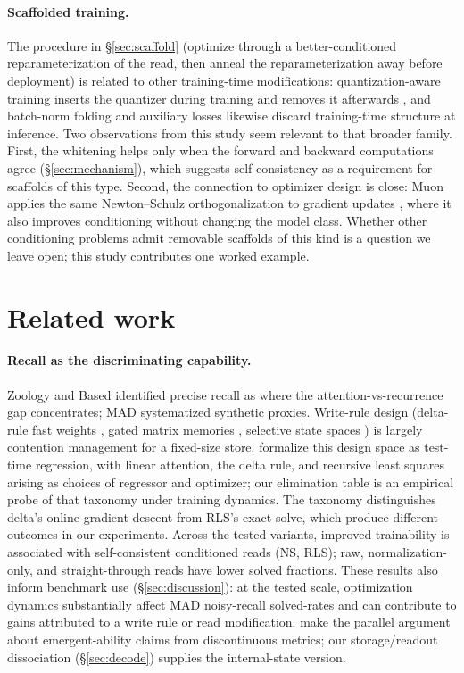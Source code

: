\documentclass[11pt]{article}
\begin{document}
\paragraph{Scaffolded training.} The procedure in
\S\ref{sec:scaffold} (optimize through a better-conditioned reparameterization
of the read, then anneal the reparameterization away before deployment) is related to
other training-time modifications: quantization-aware training inserts the quantizer
during
training and removes it afterwards \citep{jacob2018qat}, and batch-norm folding
and auxiliary losses likewise discard training-time structure at inference. Two
observations from this study seem relevant to that broader family. First, the
whitening helps only when the forward and backward computations agree
(\S\ref{sec:mechanism}), which suggests self-consistency as a requirement for
scaffolds of this type. Second, the connection to optimizer design is close: Muon
applies the same Newton--Schulz orthogonalization to gradient updates
\citep{jordan2024muon,wang2025muonmemory}, where it also improves conditioning
without changing the model class. Whether other conditioning problems admit
removable scaffolds of this kind is a question we leave open; this study
contributes one worked example.

\section{Related work}
\label{sec:related}

\paragraph{Recall as the discriminating capability.} Zoology and Based
\citep{arora2023zoology,arora2024based} identified precise recall as where the
attention-vs-recurrence gap concentrates; MAD \citep{poli2024mad} systematized
synthetic proxies. Write-rule design (delta-rule fast weights
\citep{schlag2021linear,yang2024deltanet}, gated matrix memories
\citep{beck2024xlstm}, selective state spaces \citep{gu2023mamba}) is largely
contention management for a fixed-size store. \citet{wang2025testtime} formalize
this design space as test-time regression, with linear attention, the delta rule,
and recursive least squares arising as choices of regressor and optimizer; our
elimination table is an empirical probe of that taxonomy under training dynamics.
The taxonomy distinguishes delta's online gradient descent from RLS's exact
solve, which produce different outcomes in our experiments. Across the tested
variants, improved trainability is associated with self-consistent conditioned
reads (NS, RLS); raw, normalization-only, and straight-through reads have lower
solved fractions. These results also inform benchmark use
(\S\ref{sec:discussion}): at the tested scale, optimization dynamics substantially
affect MAD noisy-recall solved-rates and can contribute to gains attributed to a
write rule or read modification. \citet{schaeffer2023mirage} make the parallel argument
about emergent-ability claims from discontinuous metrics; our storage/readout
dissociation (\S\ref{sec:decode}) supplies the internal-state version.
\end{document}
